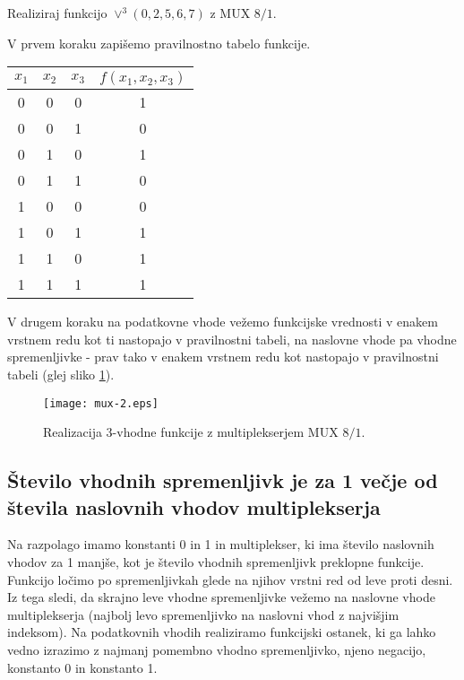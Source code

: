 \begin{zgled}
Realiziraj funkcijo $\vee^3(0,2,5,6,7)$ z MUX $8/1$.
\end{zgled}
\begin{resitev}
V prvem koraku zapišemo pravilnostno tabelo funkcije.

\begin{center}
\begin{tabular}{ccc|c}
$x_1$ & $x_2$ & $x_3$ &  $f(x_1,x_2,x_3)$ \\
\hline
0 & 0 & 0 & 1 \\
0 & 0 & 1 & 0 \\
0 & 1 & 0 & 1 \\
0 & 1 & 1 & 0 \\
1 & 0 & 0 & 0 \\
1 & 0 & 1 & 1 \\
1 & 1 & 0 & 1 \\
1 & 1 & 1 & 1 \\
\end{tabular}
\end{center}

\bigskip

V drugem koraku na podatkovne vhode vežemo funkcijske vrednosti v enakem vrstnem redu kot ti nastopajo v pravilnostni tabeli, na naslovne vhode pa vhodne spremenljivke - prav tako v enakem vrstnem redu kot nastopajo v pravilnostni tabeli (glej sliko \ref{fig:mux_zgled_1}).

\bigskip
\begin{figure}[ht]
\centering
\texttt{[image: mux-2.eps]}
\caption{Realizacija 3-vhodne funkcije z multiplekserjem MUX $8/1$.}
\label{fig:mux_zgled_1}
\end{figure}

\end{resitev}

\subsection{Število vhodnih spremenljivk je za 1 večje od števila naslovnih vhodov multiplekserja}

Na razpolago imamo konstanti 0 in 1 in  multiplekser, ki ima število naslovnih vhodov za 1 manjše, kot je število vhodnih spremenljivk preklopne funkcije. Funkcijo ločimo po spremenljivkah glede na njihov vrstni red od leve proti desni. Iz tega sledi, da skrajno leve vhodne spremenljivke vežemo na naslovne vhode multiplekserja (najbolj levo spremenljivko na naslovni vhod z najvišjim indeksom). Na podatkovnih vhodih realiziramo funkcijski ostanek, ki ga lahko vedno izrazimo z najmanj pomembno vhodno spremenljivko, njeno negacijo, konstanto 0 in konstanto 1.

